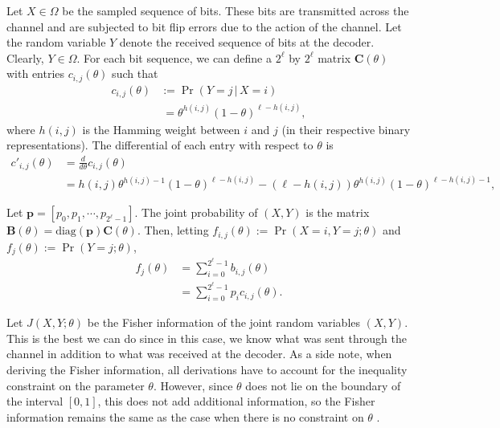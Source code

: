 \documentclass[12pt]{article}
\numberwithin{equation}{section}
\numberwithin{table}{section}
\numberwithin{figure}{section}
\newcommand{\ones}[1]{\mathbf{1}_{#1}}
\def\diag{\text{diag}}
\def\bA{\mathbf{A}}
\def\bC{\mathbf{C}}
\def\bB{\mathbf{B}}
\def\bp{\mathbf{p}}
\begin{document}
Let $X \in \Omega$ be the sampled sequence of bits. These bits are transmitted across the channel and are subjected to bit flip errors due to the
action of the channel. Let the random variable $Y$ denote the received sequence of bits at the decoder. Clearly, $Y \in \Omega$. For each bit 
sequence, we can define a $2^\ell$ by $2^\ell$ matrix $\bC(\theta)$ with entries $c_{i,j}(\theta)$ such that
\begin{align}
\nonumber
c_{i,j}(\theta) &:= \Pr(Y= j\,|\,X=i)\\
\label{eq:channel_error}
&\ = \theta^{h(i,j)} (1-\theta)^{\ell - h(i,j)},
\end{align}
where $h(i,j)$ is the Hamming weight between $i$ and $j$ (in their respective binary representations). The differential of each entry with
respect to $\theta$ is
\begin{align}
\nonumber
c'_{i,j}(\theta) &= \frac{d}{d\theta} c_{i,j}(\theta)\\
\label{eq:channel_error_diff}
&= h(i,j) \theta^{h(i,j)-1} (1-\theta)^{\ell - h(i,j)} - (\ell - h(i,j)) \theta^{h(i,j)} (1-\theta)^{\ell - h(i,j)-1},
\end{align}

Let $\bp = [p_0,p_1,\cdots,p_{2^\ell-1}]$.
The joint probability of $(X,Y)$ is the matrix $\bB(\theta) = \diag(\bp) \bC(\theta)$.
Then, letting $f_{i,j}(\theta) := \Pr(X=i,Y=j;\theta)$ and $f_{j}(\theta) := \Pr(Y=j;\theta)$,
\begin{align*}
f_j(\theta) &= \sum_{i=0}^{2^\ell-1} b_{i,j}(\theta)\\
&= \sum_{i=0}^{2^\ell-1} p_i c_{i,j}(\theta).
\end{align*}



Let $J(X,Y;\theta)$ be the Fisher information of the joint random variables $(X,Y)$. This is the best we can do since in this case, we know what
was sent through the channel in addition to what was received at the decoder. As a side note, when deriving the Fisher information, all 
derivations have to account for the inequality constraint on the parameter $\theta$. However, since $\theta$ does not lie on the boundary of the 
interval $[0,1]$, this does not add additional information, so the Fisher information remains the same as the case when there is no constraint on 
$\theta$ \cite{Gorman90CRB}.
\end{document}
